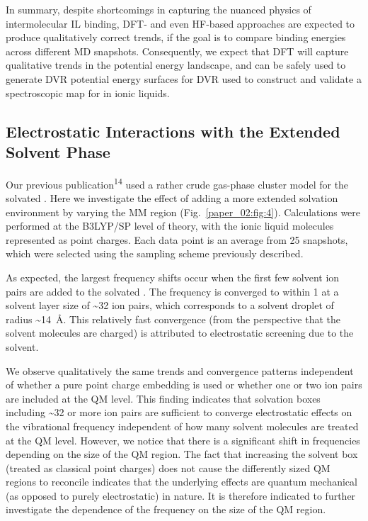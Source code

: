 In summary, despite shortcomings in capturing the nuanced physics of intermolecular \textendash{}IL binding, DFT- and even HF-based approaches are expected to produce qualitatively correct trends, if the goal is to compare binding energies across different MD snapshots.  Consequently, we expect that DFT will capture qualitative trends in the potential energy landscape, and can be safely used to generate DVR potential energy surfaces for DVR used to construct and validate a spectroscopic map for  in ionic liquids.

\subsection{Electrostatic Interactions with the Extended Solvent Phase}
\label{paper_02:ssec:IIID}

Our previous publication\textsuperscript{14} used a rather crude gas-phase cluster model for the solvated . Here we investigate the effect of adding a more extended solvation environment by varying the MM region (Fig.~\ref{paper_02:fig:4}). Calculations were performed at the B3LYP/SP level of theory, with the ionic liquid molecules represented as point charges. Each data point is an average from \num{25} snapshots, which were selected using the sampling scheme previously described.

As expected, the largest frequency shifts occur when the first few solvent ion pairs are added to the solvated . The frequency is converged to within \SI{1}{\wavenumber} at a solvent layer size of \textasciitilde{}\num{32} ion pairs, which corresponds to a solvent droplet of radius \textasciitilde{}\SI{14}{\angstrom}. This relatively fast convergence (from the perspective that the solvent molecules are charged) is attributed to electrostatic screening due to the solvent.

We observe qualitatively the same trends and convergence patterns independent of whether a pure point charge embedding is used or whether one or two ion pairs are included at the QM level. This finding indicates that solvation boxes including \textasciitilde{}\num{32} or more ion pairs are sufficient to converge electrostatic effects on the vibrational frequency independent of how many solvent molecules are treated at the QM level. However, we notice that there is a significant shift in frequencies depending on the size of the QM region. The fact that increasing the solvent box (treated as classical point charges) does not cause the differently sized QM regions to reconcile indicates that the underlying effects are quantum mechanical (as opposed to purely electrostatic) in nature. It is therefore indicated to further investigate the dependence of the frequency on the size of the QM region.

